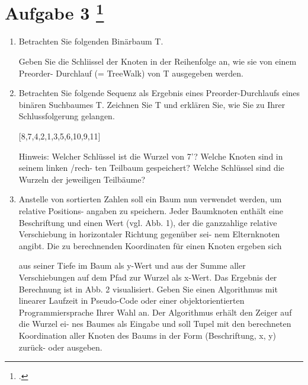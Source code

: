 \documentclass{lehramt-informatik-aufgabe}
\begin{document}
\section{Aufgabe 3
\footcite{66115:2021:03}}

\begin{enumerate}
\item Betrachten Sie folgenden Binärbaum T.

Geben Sie die Schliissel der Knoten in der Reihenfolge an, wie sie von
einem Preorder- Durchlauf (= TreeWalk) von T ausgegeben werden.

\item Betrachten Sie folgende Sequenz als Ergebnis eines
Preorder-Durchlaufs eines binären Suchbaumes T. Zeichnen Sie T und
erklären Sie, wie Sie zu Ihrer Schlussfolgerung gelangen.

[8,7,4,2,1,3,5,6,10,9,11]

Hinweis: Welcher Schlüssel ist die Wurzel von 7’? Welche Knoten sind in
seinem linken /rech- ten Teilbaum gespeichert? Welche Schlüssel sind die
Wurzeln der jeweiligen Teilbäume?

\item Anstelle von sortierten Zahlen soll ein Baum nun verwendet werden,
um relative Positions- angaben zu speichern. Jeder Baumknoten enthält
eine Beschriftung und einen Wert (vgl. Abb. 1), der die ganzzahlige
relative Verschiebung in horizontaler Richtung gegenüber sei- nem
Elternknoten angibt. Die zu berechnenden Koordinaten für einen Knoten
ergeben sich

aus seiner Tiefe im Baum als y-Wert und aus der Summe aller
Verschiebungen auf dem Pfad zur Wurzel als x-Wert. Das Ergebnis der
Berechnung ist in Abb. 2 visualisiert. Geben Sie einen Algorithmus mit
linearer Laufzeit in Pseudo-Code oder einer objektorientierten
Programmiersprache Ihrer Wahl an. Der Algorithmus erhält den Zeiger auf
die Wurzel ei- nes Baumes als Eingabe und soll Tupel mit den berechneten
Koordination aller Knoten des Baums in der Form (Beschriftung, x, y)
zurück- oder ausgeben.

\end{enumerate}
\end{document}
